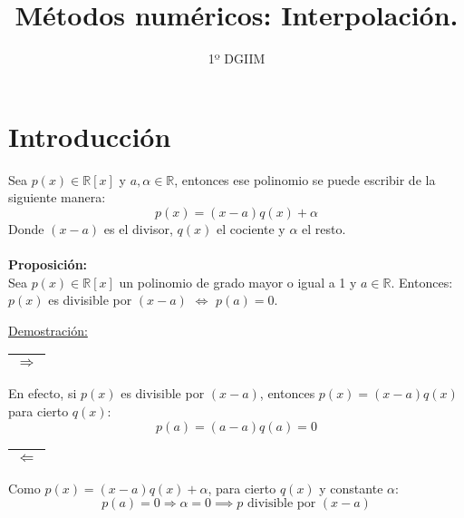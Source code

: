 \documentclass{article}
\title{\LARGE{\textbf{Métodos numéricos: Interpolación.}}}
\author{1º DGIIM}
\date{}
\begin{document}
\maketitle

\hrulefill

\section{Introducción}

Sea $p(x)\in\mathbb{R}[x]$ y $a,\alpha\in\mathbb{R}$, entonces ese polinomio se puede escribir de la siguiente manera:
$$p(x)=(x-a)q(x)+\alpha$$
Donde $(x-a)$ es el divisor, $q(x)$ el cociente y $\alpha$ el resto.
\\
\\
\textbf{Proposición:}
\\
Sea $p(x)\in\mathbb{R}[x]$ un polinomio de grado mayor o igual a 1 y $a\in\mathbb{R}$. Entonces: $p(x)$ es divisible por $(x-a)$ $\iff$ $p(a)=0$.

\hrulefill

\underline{Demostración:}

\begin{tabular}{|c|}
\hline
$\Rightarrow$ \\
\hline
\end{tabular} En efecto, si $p(x)$ es divisible por $(x-a)$, entonces $p(x)=(x-a)q(x)$ para cierto $q(x)$: $$p(a)=(a-a)q(a)=0$$

\begin{tabular}{|c|}
\hline
$\Leftarrow$ \\
\hline
\end{tabular} Como $p(x)=(x-a)q(x)+\alpha$, para cierto $q(x)$ y constante $\alpha$:
$$p(a)=0\Rightarrow\alpha=0\implies p\text{ divisible por }(x-a)$$

\hrulefill
\end{document}
